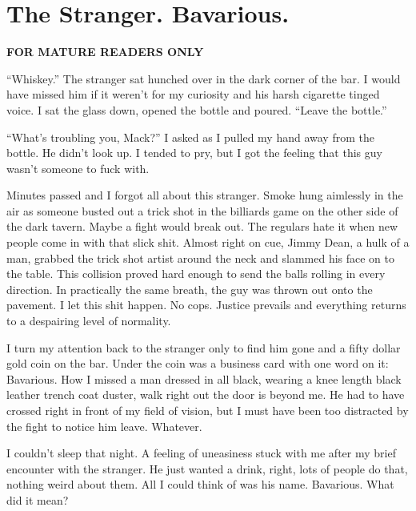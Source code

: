\chapter{The Stranger. Bavarious.}



{\bf FOR MATURE READERS ONLY}



``Whiskey.'' The stranger sat hunched over in the dark
corner of the bar. I would have missed him if it weren't for
my curiosity and his harsh cigarette tinged voice. I sat the glass
down, opened the bottle and poured. ``Leave the
bottle.''



``What's troubling you, Mack?'' I asked as I pulled
my hand away from the bottle. He didn't look up. I tended to
pry, but I got the feeling that this guy wasn't someone to
fuck with.



Minutes passed and I forgot all about this stranger. Smoke hung
aimlessly in the air as someone busted out a trick shot in the
billiards game on the other side of the dark tavern. Maybe a fight
would break out. The regulars hate it when new people come in with
that slick shit. Almost right on cue, Jimmy Dean, a hulk of a man,
grabbed the trick shot artist around the neck and slammed his face
on to the table. This collision proved hard enough to send the
balls rolling in every direction. In practically the same breath,
the guy was thrown out onto the pavement. I let this shit happen.
No cops. Justice prevails and everything returns to a despairing
level of normality.



I turn my attention back to the stranger only to find him gone and
a fifty dollar gold coin on the bar. Under the coin was a business
card with one word on it: Bavarious. How I missed a man dressed in
all black, wearing a knee length black leather trench coat duster,
walk right out the door is beyond me. He had to have crossed right
in front of my field of vision, but I must have been too distracted
by the fight to notice him leave. Whatever.



I couldn't sleep that night. A feeling of uneasiness stuck
with me after my brief encounter with the stranger. He just wanted
a drink, right, lots of people do that, nothing weird about them.
All I could think of was his name. Bavarious. What did it
mean?



